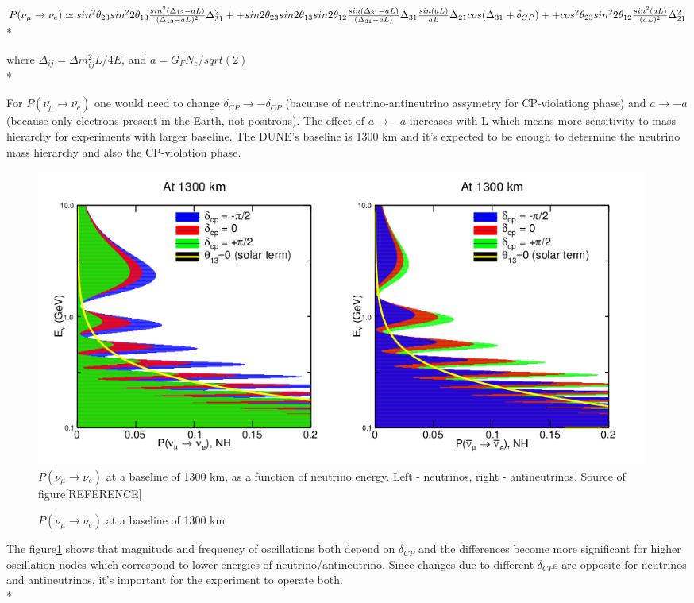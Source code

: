$P(\nu_\mu \rightarrow \nu_e) \simeq sin^2{\theta_{23}}sin^2{2\theta_{13}}\frac{sin^2(\Delta_{13}-aL)}{(\Delta_{13}-aL)^2}\Delta^2_{31}+ \\*
+sin2\theta_{23}sin2\theta_{13}sin2\theta_{12}\frac{sin(\Delta_{31}-aL)}{(\Delta_{31}-aL)}\Delta_{31}\frac{sin(aL)}{aL}\Delta_{21}cos(\Delta_{31}+\delta_{CP})+ \\*
+cos^2\theta_{23}sin^2{2\theta_{12}}\frac{sin^2(aL)}{(aL)^2}\Delta^2_{21}$\\*

where $\Delta_{ij}={\Delta}m^2_{ij}L/4E$, and $a={G_F}{N_e}/sqrt(2)$\\*

For $P(\bar{\nu_\mu} \rightarrow \bar{\nu_e})$ one would need to change $\delta_{CP} \rightarrow -\delta_{CP}$ (bacuuse of neutrino-antineutrino assymetry for CP-violationg phase) and $a \rightarrow -a$ (because only electrons present in the Earth, not positrons). The effect of $a \rightarrow -a$ increases with L which means more sensitivity to mass hierarchy for experiments with larger baseline. The DUNE's baseline is 1300 km and it's expected to be enough to determine the neutrino mass hierarchy and also the CP-violation phase.

\begin{figure}
\caption{$P(\nu_\mu \rightarrow \nu_e)$ at a baseline of 1300 km}
\label{fig:LBNF_oscProbability}
\centering
\includegraphics[width=0.98\textwidth, keepaspectratio=true]{figs/LBNF_oscProbability.png}
\\$P(\nu_\mu \rightarrow \nu_e)$ at a baseline of 1300 km, as a function of neutrino energy. Left - neutrinos, right - antineutrinos. Source of figure[REFERENCE]
\end{figure}

The figure\ref{fig:LBNF_oscProbability} shows that magnitude and frequency of oscillations both depend on $\delta_{CP}$ and the differences become more significant for higher oscillation nodes which correspond to lower energies of neutrino/antineutrino. Since changes due to different $\delta_{CP}$s are opposite for neutrinos and antineutrinos, it's important for the experiment to operate both.\\*

